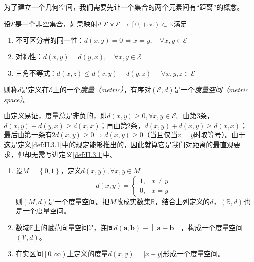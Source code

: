 \documentclass[main.tex]{subfiles}
\begin{document}
为了建立一个几何空间，我们需要先让一个集合的两个元素间有“距离”的概念。

\begin{definition}[度量空间]\label{def:II.3.1}
    设$\mathcal{E}$是一个非空集合，如果映射$d:\mathcal{E}\times\mathcal{E}\rightarrow\left[0,+\infty\right)\subset\mathbb{R}$满足
    \begin{enumerate}
        \item 不可区分者的同一性：$d\left(x,y\right)=0\Leftrightarrow x=y,\quad\forall x,y\in\mathcal{E}$
        \item 对称性：$d\left(x,y\right)=d\left(y,x\right),\quad\forall x,y\in\mathcal{E}$
        \item 三角不等式：$d\left(x,z\right)\leq d\left(x,y\right)+d\left(y,z\right),\quad\forall x,y,z\in\mathcal{E}$
    \end{enumerate}
    则称$d$是定义在$\mathcal{E}$上的一个\emph{度量（metric）}，有序对$\left(\mathcal{E},d\right)$是一个\emph{度量空间（metric space）}。
\end{definition}

由定义易证，度量总是非负的，即$d\left(x,y\right)\geq0,\forall x,y\in\mathcal{E}$。由第3条，$d\left(x,y\right)+d\left(y,x\right)\geq d\left(x,x\right)$；再由第2条，$d\left(x,y\right)+d\left(x,y\right)\geq d\left(x,x\right)$；最后由第一条有$2d\left(x,y\right)\geq0\Rightarrow d\left(x,y\right)\geq0$（当且仅当$x=y$时取等号）。由于这是定义\ref{def:II.3.1}中的规定能够推出的，因此就算它是我们对距离的最直观要求，但却无需写进定义\ref{def:II.3.1}中。

\begin{example}\label{exp:II.3.1}
    \begin{enumerate}
        \item 设$M=\left\{0,1\right\}$，定义$d\left(x,y\right),\forall x,y\in M$
              \[d\left(x,y\right)=\left\{\begin{array}{ll}1,&x\neq y\\0,&x=y\end{array}\right.\]
              则$\left(M,d\right)$是一个度量空间。把$M$改成实数集$\mathbb{R}$，结合上列定义的$d$，$\left(\mathbb{R},d\right)$也是一个度量空间。
        \item 数域$\mathbb{F}$上的赋范向量空间$\mathcal{V}$，连同$d\left(\mathbf{a},\mathbf{b}\right)\equiv\left\|\mathbf{a}-\mathbf{b}\right\|$，构成一个度量空间$\left(\mathcal{V},d\right)$。
        \item 在实区间$\left[0,\infty\right)$上定义的度量$d\left(x,y\right)=\left|x-y\right|$形成一个度量空间。
    \end{enumerate}
\end{example}
\end{document}
